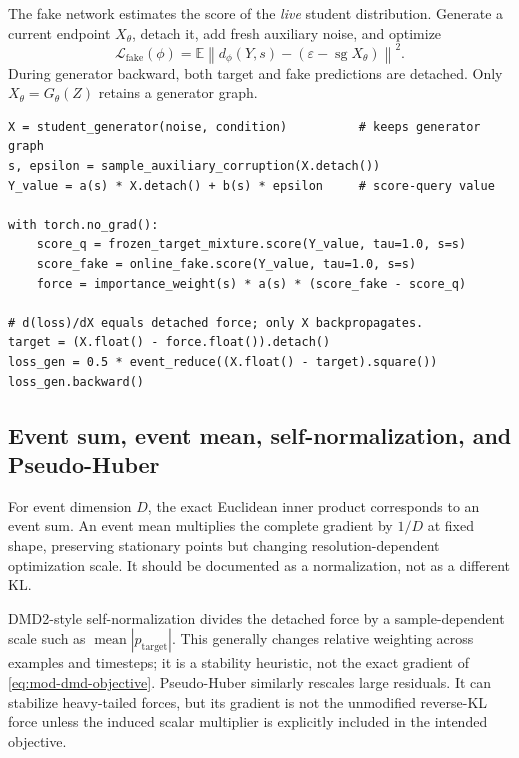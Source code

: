 \documentclass[11pt,a4paper]{article}
\newcommand{\E}{\mathbb{E}}
\newcommand{\norm}[1]{\left\lVert #1 \right\rVert}
\newcommand{\sg}{\operatorname{sg}}
\newcommand{\fake}{\mathrm{fake}}
\newcommand{\target}{\mathrm{target}}
\theoremstyle{plain}
\theoremstyle{definition}
\begin{document}
The fake network estimates the score of the \emph{live} student distribution.  Generate a current
endpoint $X_\theta$, detach it, add fresh auxiliary noise, and optimize
\begin{equation}
\mathcal L_{\fake}(\phi)
=\E\norm{d_\phi(Y,s)-(\varepsilon-\sg X_\theta)}^2.
\label{eq:fake-loss}
\end{equation}
During generator backward, both target and fake predictions are detached.  Only
$X_\theta=G_\theta(Z)$ retains a generator graph.

\begin{lstlisting}[style=goodpython,caption={Conceptual endpoint generator update with exact detach roles.}]
X = student_generator(noise, condition)          # keeps generator graph
s, epsilon = sample_auxiliary_corruption(X.detach())
Y_value = a(s) * X.detach() + b(s) * epsilon     # score-query value

with torch.no_grad():
    score_q = frozen_target_mixture.score(Y_value, tau=1.0, s=s)
    score_fake = online_fake.score(Y_value, tau=1.0, s=s)
    force = importance_weight(s) * a(s) * (score_fake - score_q)

# d(loss)/dX equals detached force; only X backpropagates.
target = (X.float() - force.float()).detach()
loss_gen = 0.5 * event_reduce((X.float() - target).square())
loss_gen.backward()
\end{lstlisting}

\subsection{Event sum, event mean, self-normalization, and Pseudo-Huber}

For event dimension $D$, the exact Euclidean inner product corresponds to an event sum.
An event mean multiplies the complete gradient by $1/D$ at fixed shape, preserving stationary
points but changing resolution-dependent optimization scale.  It should be documented as a
normalization, not as a different KL.

DMD2-style self-normalization divides the detached force by a sample-dependent scale such as
$\operatorname{mean}|p_{\target}|$.  This generally changes relative weighting across examples
and timesteps; it is a stability heuristic, not the exact gradient of
\eqref{eq:mod-dmd-objective}.  Pseudo-Huber similarly rescales large residuals.  It can stabilize
heavy-tailed forces, but its gradient is not the unmodified reverse-KL force unless the induced
scalar multiplier is explicitly included in the intended objective.
\end{document}
